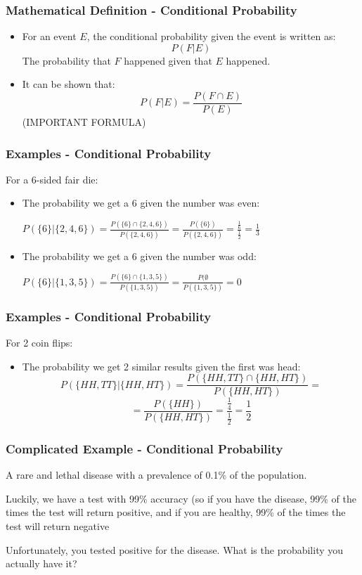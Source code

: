 \documentclass{beamer}
\begin{document}
\begin{frame}
\frametitle{Mathematical Definition - Conditional Probability}
\begin{itemize}
\item For an event $E$, the conditional probability given the event is written as:
$$P(F|E)$$
The probability that $F$ happened given that $E$ happened.
\item It can be shown that:
$$P(F|E)=\frac {P(F \cap E)}{P(E)}$$
(IMPORTANT FORMULA)
\end{itemize}
\end{frame}



\begin{frame}
\frametitle{Examples - Conditional Probability}
For a 6-sided fair die:
\begin{itemize}
\item The probability we get a 6 given the number was even:

$ P(\{6\}|\{2,4,6\})=\frac{P(\{6\} \cap \{2,4,6\})}{P(\{2,4,6\})} = \frac{P(\{6\})}{P(\{2,4,6\})}=\frac{\frac{1}{6}}{\frac{1}{2}}=\frac{1}{3}$

\item The probability we get a 6 given the number was odd:


$ P(\{6\}|\{1,3,5\})=\frac{P(\{6\} \cap \{1,3,5\})}{P(\{1,3,5\})}=\frac{P(\emptyset}{P(\{1,3,5\})}=0 $

\end{itemize}
\end{frame}

\begin{frame}
\frametitle{Examples - Conditional Probability}
For 2 coin flips:
\begin{itemize}
\item The probability we get 2 similar results given the first was head:
$$ P(\{HH,TT\}|\{HH,HT\})=\frac{P(\{HH,TT\} \cap \{HH,HT\})}{P(\{HH,HT\})} =$$ $$=\frac{P(\{HH\})}{P(\{HH,HT\})}=\frac{\frac{1}{4}}{\frac{1}{2}}=\frac{1}{2}$$


\end{itemize}
\end{frame}


\begin{frame}
\frametitle{Complicated Example - Conditional Probability}
A rare and lethal disease with a prevalence of 0.1\% of the population. 

Luckily, we have a test with 99\% accuracy (so if you have the disease, 99\% of the times the test will return positive, and if you are healthy, 99\% of the times the test will return negative

Unfortunately, you tested positive for the disease. What is the probability you actually have it?

\end{frame}
\end{document}
